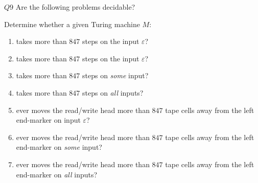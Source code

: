 \documentclass{article}
\theoremstyle{definition}
\theoremstyle{definition}
\theoremstyle{remark}
\begin{document}
\begin{questionbox}{$Q9$}
    Are the following problems decidable?
    
    Determine whether a given Turing machine $M$:
    \begin{enumerate}
        \item[$(i)$] takes more than $847$ steps on the input $\varepsilon$?
        
        \item[$(i)$] takes more than $847$ steps on the input $\varepsilon$?
        
        \item[$(ii)$] takes more than $847$ steps on \textit{some} input?
    
        \item[$(iii)$] takes more than $847$ steps on \textit{all} inputs?
    
        \item[$(iv)$] ever moves the read/write head more than $847$ tape cells away from the left end-marker on input $\varepsilon$?
        
        \item[$(v)$] ever moves the read/write head more than $847$ tape cells away from the left end-marker on \textit{some} input?
        
        \item[$(vi)$] ever moves the read/write head more than $847$ tape cells away from the left end-marker on \textit{all} inputs?
    \end{enumerate}
\end{questionbox}

\bigskip
\end{document}
